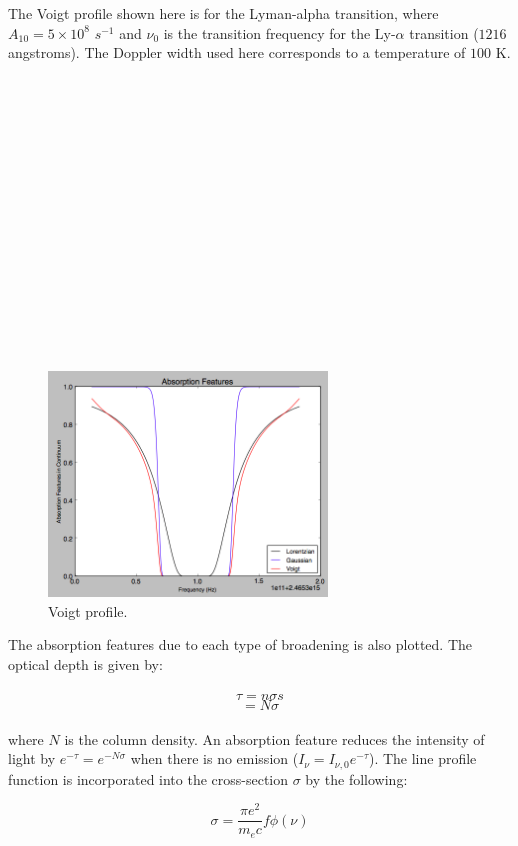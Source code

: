 \documentclass{article}
\begin{document}
The Voigt profile shown here is for the Lyman-alpha transition, where $A_{10} = 5 \times 10^{8}$ $s^{-1}$ and $\nu_{0}$ is the transition frequency for the Ly-$\alpha$ transition ($1216$ angstroms). The Doppler width used here corresponds to a temperature of $100$ K.\\ \\ \\ \\ \\ \\ \\ \\ \\ \\ \\ \\ \\ \\ \\ \\

\begin{figure}[ht]
    \centering
    \includegraphics[width=0.66\textwidth]{figures/hw11pic2.png}
    \caption{Voigt profile.}
    \label{fig:voigt2}
\end{figure}

The absorption features due to each type of broadening is also plotted. The optical depth is given by: \\ \\
$$\tau = n \sigma s$$ 
$$ = N\sigma$$ \\

where $N$ is the column density. An absorption feature reduces the intensity of light by $e^{-\tau} = e^{-N\sigma}$ when there is no emission ($I_{\nu} = I_{\nu,0}e^{-\tau}$). The line profile function is incorporated into the cross-section $\sigma$ by the following:

$$\sigma = {\frac{\pi e^{2}}{m_{e}c}}f\phi(\nu)$$ \\
\end{document}
